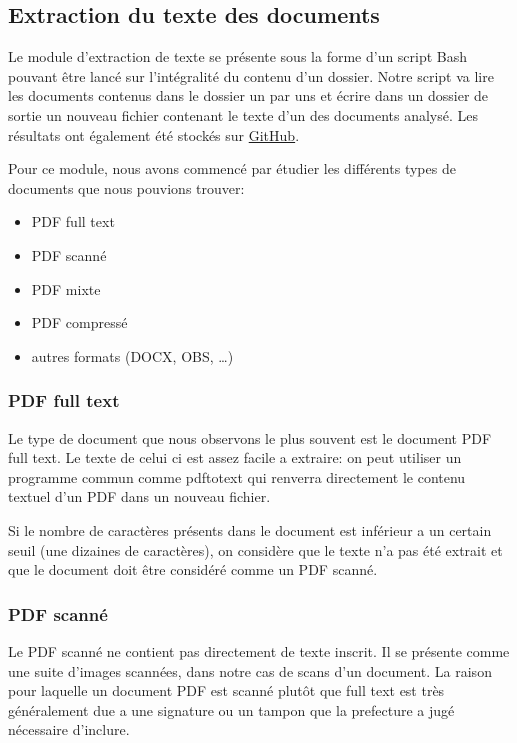 
\subsection{Extraction du texte des documents}
Le module d'extraction de texte se présente sous la forme d'un script Bash pouvant être lancé sur l'intégralité du contenu d'un dossier.
Notre script va lire les documents contenus dans le dossier un par uns et écrire dans un dossier de sortie un nouveau fichier contenant le texte d'un des documents analysé.
Les résultats ont également été stockés sur \href{https://github.com/smallito/PFE/tree/master/codes/transcripts}{GitHub}.

Pour ce module, nous avons commencé par étudier les différents types de documents que nous pouvions trouver:
\begin{itemize}
\item PDF full text
\item PDF scanné
\item PDF mixte
\item PDF compressé
\item autres formats (DOCX, OBS, \ldots)
\end{itemize}

\subsubsection{PDF full text}
Le type de document que nous observons le plus souvent est le document PDF full text.
Le texte de celui ci est assez facile a extraire: on peut utiliser un programme commun comme pdftotext qui renverra directement le contenu textuel d'un PDF dans un nouveau fichier.

Si le nombre de caractères présents dans le document est inférieur a un certain seuil (une dizaines de caractères), on considère que le texte n'a pas été extrait et que le document doit être considéré comme un PDF scanné.

\subsubsection{PDF scanné}
Le PDF scanné ne contient pas directement de texte inscrit.
Il se présente comme une suite d'images scannées, dans notre cas de scans d'un document.
La raison pour laquelle un document PDF est scanné plutôt que full text est très généralement due a une signature ou un tampon que la prefecture a jugé nécessaire d'inclure.

